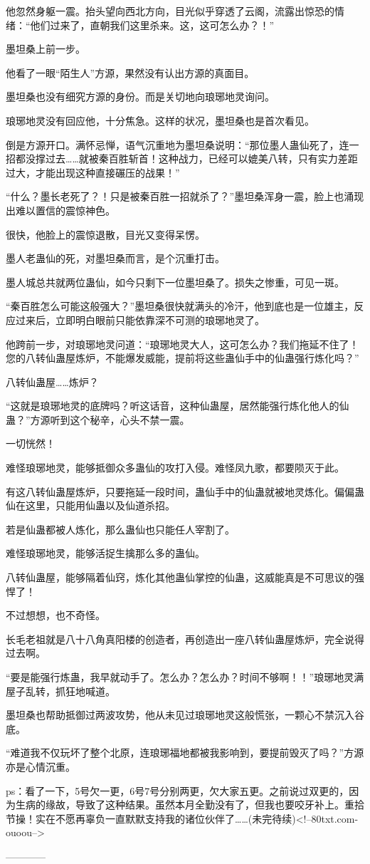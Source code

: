 \begin{this_body}
他忽然身躯一震。抬头望向西北方向，目光似乎穿透了云阁，流露出惊恐的情绪：“他们过来了，直朝我们这里杀来。这，这可怎么办？！”

墨坦桑上前一步。

他看了一眼“陌生人”方源，果然没有认出方源的真面目。

墨坦桑也没有细究方源的身份。而是关切地向琅琊地灵询问。

琅琊地灵没有回应他，十分焦急。这样的状况，墨坦桑也是首次看见。

倒是方源开口。满怀忌惮，语气沉重地为墨坦桑说明：“那位墨人蛊仙死了，连一招都没撑过去……就被秦百胜斩首！这种战力，已经可以媲美八转，只有实力差距过大，才能出现这种直接碾压的战果！”

“什么？墨长老死了？！只是被秦百胜一招就杀了？”墨坦桑浑身一震，脸上也涌现出难以置信的震惊神色。

很快，他脸上的震惊退散，目光又变得呆愣。

墨人老蛊仙的死，对墨坦桑而言，是个沉重打击。

墨人城总共就两位蛊仙，如今只剩下一位墨坦桑了。损失之惨重，可见一斑。

“秦百胜怎么可能这般强大？”墨坦桑很快就满头的冷汗，他到底也是一位雄主，反应过来后，立即明白眼前只能依靠深不可测的琅琊地灵了。

他跨前一步，对琅琊地灵问道：“琅琊地灵大人，这可怎么办？我们拖延不住了！您的八转仙蛊屋炼炉，不能爆发威能，提前将这些蛊仙手中的仙蛊强行炼化吗？”

八转仙蛊屋……炼炉？

“这就是琅琊地灵的底牌吗？听这话音，这种仙蛊屋，居然能强行炼化他人的仙蛊？”方源听到这个秘辛，心头不禁一震。

一切恍然！

难怪琅琊地灵，能够抵御众多蛊仙的攻打入侵。难怪凤九歌，都要陨灭于此。

有这八转仙蛊屋炼炉，只要拖延一段时间，蛊仙手中的仙蛊就被地灵炼化。偏偏蛊仙在这里，只能用仙蛊以及仙道杀招。

若是仙蛊都被人炼化，那么蛊仙也只能任人宰割了。

难怪琅琊地灵，能够活捉生擒那么多的蛊仙。

八转仙蛊屋，能够隔着仙窍，炼化其他蛊仙掌控的仙蛊，这威能真是不可思议的强悍了！

不过想想，也不奇怪。

长毛老祖就是八十八角真阳楼的创造者，再创造出一座八转仙蛊屋炼炉，完全说得过去啊。

“要是能强行炼蛊，我早就动手了。怎么办？怎么办？时间不够啊！！”琅琊地灵满屋子乱转，抓狂地喊道。

墨坦桑也帮助抵御过两波攻势，他从未见过琅琊地灵这般慌张，一颗心不禁沉入谷底。

“难道我不仅玩坏了整个北原，连琅琊福地都被我影响到，要提前毁灭了吗？”方源亦是心情沉重。

ps：看了一下，5号欠一更，6号7号分别两更，欠大家五更。之前说过双更的，因为生病的缘故，导致了这种结果。虽然本月全勤没有了，但我也要咬牙补上。重拾节操！实在不愿再辜负一直默默支持我的诸位伙伴了……(未完待续)<!--80txt.com-ouoou-->

------------

\end{this_body}

